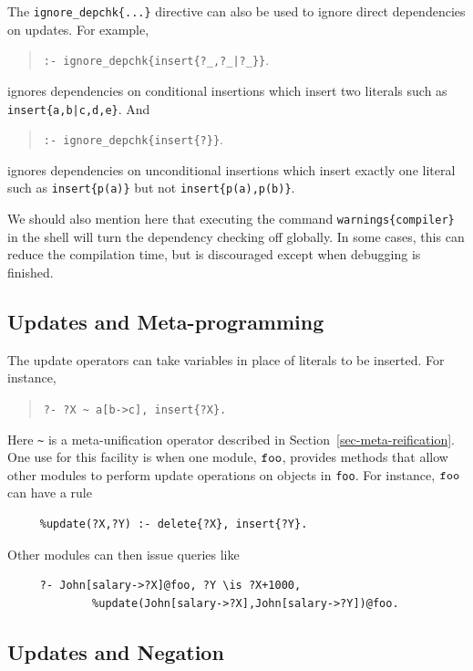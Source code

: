 \documentclass[11pt]{article}
\newcommand{\ERGO}{\mbox{\smaller{\ensuremath{\cal{E}}\smaller{{\sc{RGO}}}}}\xspace}
\newcommand{\FLSYSTEM}{\ERGO}
\begin{document}
The {\tt ignore\_depchk\{...\}} directive can also be used to ignore direct
dependencies on updates. For example, 
\begin{quote}
{\tt :- ignore\_depchk\{insert\{?\_,?\_|?\_\}\}}.
\end{quote}
\noindent ignores dependencies on conditional insertions which insert
two literals such as {\tt insert\{a,b|c,d,e\}}. And
\begin{quote}
{\tt :- ignore\_depchk\{insert\{?\}\}}.
\end{quote}
\noindent ignores dependencies on unconditional insertions which insert
exactly one literal such as {\tt insert\{p(a)\}} but not {\tt insert\{p(a),p(b)\}}. 

We should also mention here that executing the command
\texttt{warnings\{compiler\}} in the \FLSYSTEM shell will turn the dependency
checking off globally. In some cases, this can 
reduce the compilation time, but is discouraged except when debugging is
finished.



\subsection{Updates and Meta-programming}

The update operators can take variables in place of literals to be
inserted.  For instance,
\begin{quote}
 {\tt ?-  ?X \verb|~| a[b->c], insert\{?X\}.}
\end{quote}
  Here \verb|~| is a meta-unification operator described in
  Section~\ref{sec-meta-reification}.
One use for this facility is when one module, $\tt foo$, provides methods that
allow other modules to perform update operations on objects in {\tt foo}.
For instance, $\tt foo$ can have a rule
\begin{verbatim}
     %update(?X,?Y) :- delete{?X}, insert{?Y}.
\end{verbatim}
Other modules can then issue queries like
\begin{verbatim}
     ?- John[salary->?X]@foo, ?Y \is ?X+1000,
             %update(John[salary->?X],John[salary->?Y])@foo.  
\end{verbatim}

\subsection{Updates and Negation}
\end{document}
